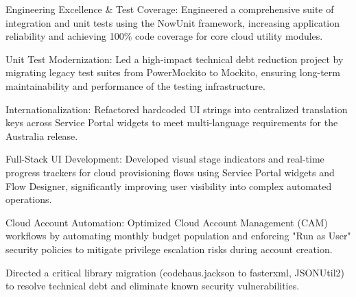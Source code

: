 \begin{cventries}
{\begin{cvitems}
        \item {Engineering Excellence \& Test Coverage: Engineered a comprehensive suite of integration and unit tests using the NowUnit framework, increasing application reliability and achieving 100\% code coverage for core cloud utility modules.}
        \item {Unit Test Modernization: Led a high-impact technical debt reduction project by migrating legacy test suites from PowerMockito to Mockito, ensuring long-term maintainability and performance of the testing infrastructure.}
        \item {Internationalization: Refactored hardcoded UI strings into centralized translation keys across Service Portal widgets to meet multi-language requirements for the Australia release.}
        \item {Full-Stack UI Development: Developed visual stage indicators and real-time progress trackers for cloud provisioning flows using Service Portal widgets and Flow Designer, significantly improving user visibility into complex automated operations.}
        \item {Cloud Account Automation: Optimized Cloud Account Management (CAM) workflows by automating monthly budget population and enforcing "Run as User" security policies to mitigate privilege escalation risks during account creation.}
        \item {Directed a critical library migration (codehaus.jackson to fasterxml, JSONUtil2) to resolve technical debt and eliminate known security vulnerabilities.}
      \end{cvitems}
    }


\end{cventries}
